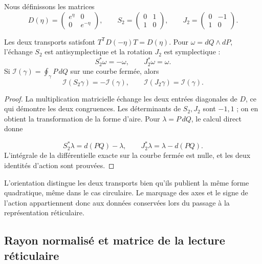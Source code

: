 Nous définissons les matrices
\begin{equation}
 D(\eta)=\begin{pmatrix}e^\eta&0\\0&e^{-\eta}\end{pmatrix},
 \qquad
 S_2=\begin{pmatrix}0&1\\1&0\end{pmatrix},
 \qquad
 J_2=\begin{pmatrix}0&-1\\1&0\end{pmatrix}.
 \label{iv:ellipse:transportes}
\end{equation}

\begin{proposition}
\label{iv:ellipse:accion-reciproca}
Les deux transports satisfont
\(T^{\mathsf T}D(-\eta)T=D(\eta)\).
Pour \(\omega=dQ\wedge dP\), l’échange \(S_2\) est
antisymplectique et la rotation \(J_2\) est symplectique :
\[
 S_2^*\omega=-\omega,\qquad J_2^*\omega=\omega.
\]
Si \(\mathcal I(\gamma)=\oint_\gamma P\,dQ\) sur une
courbe fermée, alors
\begin{equation}
 \mathcal I(S_2\gamma)=-\mathcal I(\gamma),\qquad
 \mathcal I(J_2\gamma)=\mathcal I(\gamma).
 \label{iv:ellipse:signos-accion}
\end{equation}
\end{proposition}
\begin{proof}
La multiplication matricielle échange les deux entrées
diagonales de \(D\), ce qui démontre les deux congruences.
Les déterminants de \(S_2,J_2\) sont \(-1,1\) ;
on en obtient la transformation de la forme d’aire.
Pour \(\lambda=P\,dQ\), le calcul direct donne

\[
 S_2^*\lambda=d(PQ)-\lambda,\qquad
 J_2^*\lambda=\lambda-d(PQ).
\]
L’intégrale de la différentielle exacte sur la courbe fermée
est nulle, et les deux identités d’action sont prouvées.
\end{proof}

L’orientation distingue les deux transports bien qu’ils publient
la même forme quadratique, même dans le cas circulaire.
Le marquage des axes et le signe de l’action appartiennent
donc aux données conservées lors du passage à la
représentation réticulaire.

\subsection{Rayon normalisé et matrice de la lecture réticulaire}
\label{iv:ellipse:radio}

